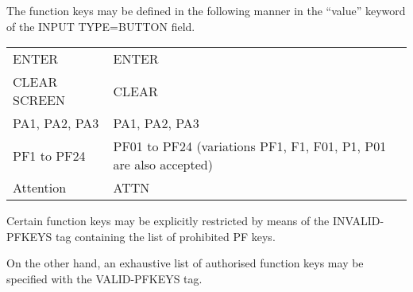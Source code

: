 \documentclass[letterpaper,10pt,english]{sphinxmanual}
\begin{document}
The function keys may be defined in the following manner in the “value” keyword of the INPUT TYPE=BUTTON field.


\begin{savenotes}\sphinxattablestart
\centering
\begin{tabulary}{\linewidth}[t]{|T|T|}
\hline
{}\relax &\relax \\
\hline
ENTER
&
ENTER
\\
\hline
CLEAR SCREEN
&
CLEAR
\\
\hline
PA1, PA2, PA3
&
PA1, PA2, PA3
\\
\hline
PF1 to PF24
&
PF01 to PF24 (variations PF1, F1, F01, P1, P01 are also accepted)
\\
\hline
Attention
&
ATTN
\\
\hline
\end{tabulary}
\par
\sphinxattableend\end{savenotes}



Certain function keys may be explicitly restricted by means of the INVALID-PFKEYS tag containing the list of prohibited PF keys.

\begin{sphinxVerbatim}[commandchars=\\\{\}]
       
\end{sphinxVerbatim}

On the other hand, an exhaustive list of authorised function keys may be specified with the VALID-PFKEYS tag.

\begin{sphinxVerbatim}[commandchars=\\\{\}]
       
\end{sphinxVerbatim}
\end{document}
